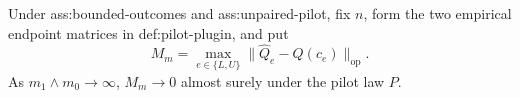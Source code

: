 Under ass:bounded-outcomes and ass:unpaired-pilot, fix \(n\), form the two empirical endpoint matrices in def:pilot-plugin, and put
\[
 M_m=\max_{e\in\{L,U\}}
 \lVert \widehat Q_e-Q(c_e)\rVert_{\mathrm{op}}.
\]
As \(m_1\wedge m_0\to\infty\), \(M_m\to0\) almost surely under the pilot law \(P\).